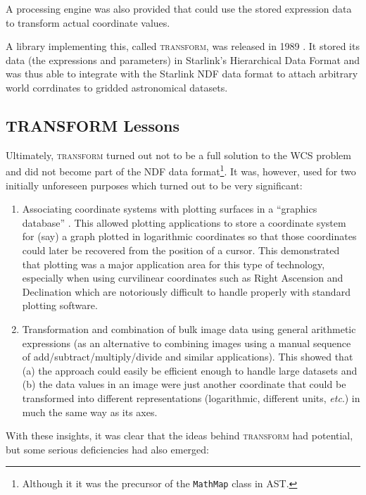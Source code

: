 \documentclass[final,authoryear,5p,times,twocolumn]{elsarticle}
\begin{document}
A processing engine was also provided that could use the stored
expression data to transform actual coordinate values.

A library implementing this, called \textsc{transform}, was released
in 1989 \citep{SUN61,1989StarB...4....7L}. It stored its data (the
expressions and parameters) in Starlink's Hierarchical Data Format
\citep[HDS;][]{SUN92,SSN27,2015HDS} and was thus able to integrate with the
Starlink NDF data format to attach arbitrary world corrdinates to
gridded astronomical datasets.


\subsection{TRANSFORM Lessons}

Ultimately, \textsc{transform} turned out not to be a full solution to
the WCS problem and did not become part of the NDF data
format\footnote{Although it it was the precursor of the
  \texttt{MathMap} class in AST.}. It was, however, used for two
initially unforeseen purposes which turned out to be very significant:

\begin{enumerate}
\item Associating coordinate systems with plotting surfaces in a
  ``graphics database'' \citep[see e.g.,][]{SUN48}. This allowed
  plotting applications to store a coordinate system for (say) a graph
  plotted in logarithmic coordinates so that those coordinates could
  later be recovered from the position of a cursor. This demonstrated
  that plotting was a major application area for this type of
  technology, especially when using curvilinear coordinates such as
  Right Ascension and Declination which are notoriously difficult to
  handle properly with standard plotting software.

\item Transformation and combination of bulk image data using general
  arithmetic expressions (as an alternative to combining images using
  a manual sequence of add/subtract/multiply/divide and similar
  applications). This showed that (a) the approach could easily be
  efficient enough to handle large datasets and (b) the data values in
  an image were just another coordinate that could be transformed into
  different representations (logarithmic, different units, \emph{etc}.) in
  much the same way as its axes.
\end{enumerate}

With these insights, it was clear that the ideas behind
\textsc{transform} had potential, but some serious deficiencies had
also emerged:
\end{document}
